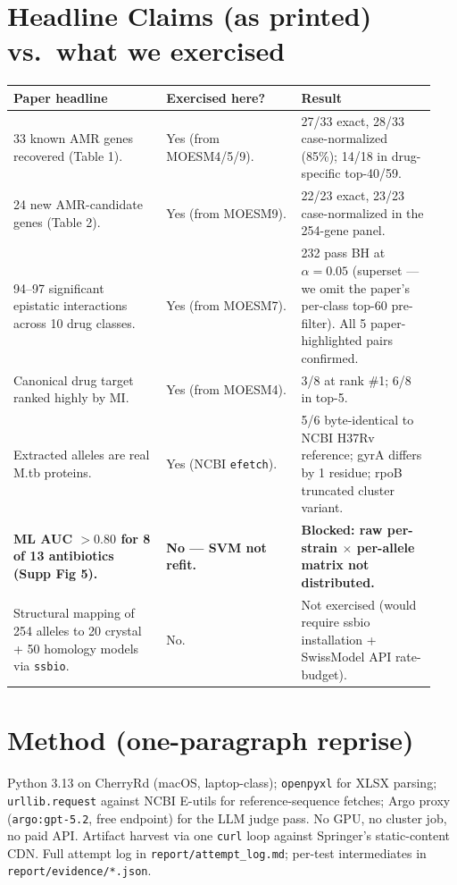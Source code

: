 \documentclass[11pt]{article}
\begin{document}
\section{Headline Claims (as printed) vs.\ what we exercised}
\begin{longtable}{@{}p{0.34\linewidth}p{0.30\linewidth}p{0.30\linewidth}@{}}
\toprule
\textbf{Paper headline} & \textbf{Exercised here?} & \textbf{Result} \\
\midrule
\endhead
33 known AMR genes recovered (Table 1). & Yes (from MOESM4/5/9).
  & 27/33 exact, 28/33 case-normalized (85\%); 14/18 in drug-specific top-40/59. \\
24 new AMR-candidate genes (Table 2). & Yes (from MOESM9).
  & 22/23 exact, 23/23 case-normalized in the 254-gene panel. \\
94--97 significant epistatic interactions across 10 drug classes. & Yes (from MOESM7).
  & 232 pass BH at $\alpha{=}0.05$ (superset --- we omit the paper's per-class top-60 pre-filter).
    All 5 paper-highlighted pairs confirmed. \\
Canonical drug target ranked highly by MI. & Yes (from MOESM4).
  & 3/8 at rank \#1; 6/8 in top-5. \\
Extracted alleles are real M.tb proteins. & Yes (NCBI \texttt{efetch}).
  & 5/6 byte-identical to NCBI H37Rv reference; gyrA differs by 1 residue; rpoB truncated cluster variant. \\
\rowcolor{yellow!25}
\textbf{ML AUC $>0.80$ for 8 of 13 antibiotics (Supp Fig 5).}
  & \textbf{No --- SVM not refit.}
  & \textbf{Blocked: raw per-strain $\times$ per-allele matrix not distributed.} \\
Structural mapping of 254 alleles to 20 crystal + 50 homology models via \texttt{ssbio}. & No.
  & Not exercised (would require ssbio installation + SwissModel API rate-budget). \\
\bottomrule
\end{longtable}

\section{Method (one-paragraph reprise)}
Python 3.13 on CherryRd (macOS, laptop-class); \texttt{openpyxl} for XLSX parsing;
\texttt{urllib.request} against NCBI E-utils for reference-sequence fetches; Argo proxy
(\texttt{argo:gpt-5.2}, free endpoint) for the LLM judge pass. No GPU, no cluster job, no
paid API. Artifact harvest via one \texttt{curl} loop against Springer's static-content CDN.
Full attempt log in \texttt{report/attempt\_log.md}; per-test intermediates in
\texttt{report/evidence/*.json}.
\end{document}
